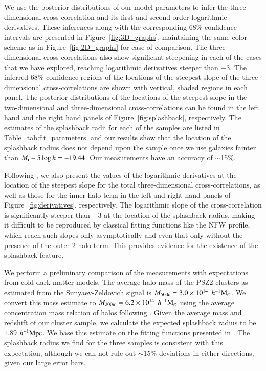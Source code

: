 \documentclass[iop, apjl, twocolappendix, numberedappendix]{emulateapj}
\def\mpch{h^{-1}{\rm Mpc}}
\def\msunh{h^{-1}{\rm M_{\odot}}}
\begin{document}
We use the posterior distributions of our model parameters to infer
the three-dimensional cross-correlation and its first and second order logarithmic
derivatives. These inferences along with the corresponding 68\%
confidence intervals are presented in Figure~\ref{fig:3D_graphs},
maintaining the same color scheme as in Figure~\ref{fig:2D_graphs}
for ease of comparison. The three-dimensional cross-correlations
also show significant steepening in each of the cases that we have
explored, reaching logarithmic derivatives steeper than $-3$. The
inferred 68\% confidence regions of the locations of the steepest
slope of the three-dimensional cross-correlations are shown with
vertical, shaded regions in each panel. The posterior
distributions of the locations of the steepest slope in the
two-dimensional and three-dimensional cross-correlations can be
found in the left hand and the right hand panels of
Figure~\ref{fig:splashback}, respectively. The estimates of the splashback radii
for each of the samples are listed in Table~\ref{tab:fit_parameters}
and our results show that the location of the splashback radius does
not depend upon the sample once we use galaxies fainter than $M_{\rm
i}-5\log h=-19.44$. Our measurements have an accuracy of $\sim$15\%.

Following \citet{baxter2017halo}, we also present the values of the
logarithmic derivatives at the location of the steepest slope for
the total three-dimensional cross-correlations, as well as those for
the inner halo term in the left and right hand panels of
Figure~\ref{fig:derivatives}, respectively. The logarithmic slope of the 
cross-correlation is significantly steeper than $-3$ at the location 
of the splashback radius, making it difficult to
be reproduced by classical fitting functions like the NFW profile,
which reach such slopes only asymptotically and even that only
without the presence of the outer 2-halo term. This provides
evidence for the existence of the splashback feature.

We perform a preliminary comparison of the measurements with
expectations from cold dark matter models. The average halo mass of
the PSZ2 clusters as estimated from the Sunyaev-Zeldovich signal
is $M_{\rm 500c}=3.0\times10^{14}$ $\msunh$. We convert this mass
estimate to $M_{\rm 200m}=6.2\times10^{14}$ $\msunh$ using the average
concentration mass relation of halos following
\citet{HuKravtsov:2003}. Given the average mass and redshift of our
cluster sample, we calculate the expected splashback radius to be
$1.89$ $\mpch$. We base this estimate on the fitting functions
presented in \citet{more2015splashback}. The splashback radius we
find for the three samples is consistent with this expectation,
although we can not rule out $\sim 15\%$ deviations in either directions,
given our large error bars.
\end{document}
